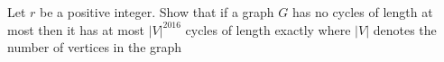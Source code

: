 Let $r$ be a positive integer. Show that if a graph $G$ has no cycles of length at most  then it has at most $|V|^{2016}$ cycles of length exactly  where $|V|$ denotes the number of vertices in the graph 